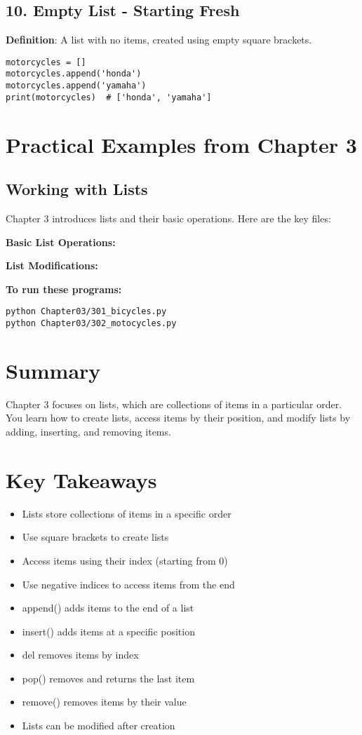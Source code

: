 \subsection*{10. Empty List - Starting Fresh}
\textbf{Definition}: A list with no items, created using empty square brackets.

\begin{lstlisting}
motorcycles = []
motorcycles.append('honda')
motorcycles.append('yamaha')
print(motorcycles)  # ['honda', 'yamaha']
\end{lstlisting}

\section*{Practical Examples from Chapter 3}

\subsection*{Working with Lists}
Chapter 3 introduces lists and their basic operations. Here are the key files:

\textbf{Basic List Operations:}


\textbf{List Modifications:}


\textbf{To run these programs:}
\begin{verbatim}
python Chapter03/301_bicycles.py
python Chapter03/302_motocycles.py
\end{verbatim}

\section*{Summary}
Chapter 3 focuses on lists, which are collections of items in a particular order. You learn how to create lists, access items by their position, and modify lists by adding, inserting, and removing items.

\section*{Key Takeaways}
\begin{itemize}
    \item Lists store collections of items in a specific order
    \item Use square brackets to create lists
    \item Access items using their index (starting from 0)
    \item Use negative indices to access items from the end
    \item append() adds items to the end of a list
    \item insert() adds items at a specific position
    \item del removes items by index
    \item pop() removes and returns the last item
    \item remove() removes items by their value
    \item Lists can be modified after creation
\end{itemize} 